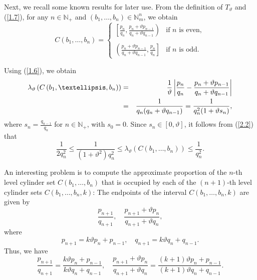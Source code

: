 \documentclass[final,1p,times]{elsarticle}
\numberwithin{equation}{section}
\begin{document}
Next, we recall some known results for later use.  
From the definition of $T_{\vartheta}$ and (\ref{1.7}), for any $n \in \mathbb{N}_+$ and $(b_1, \ldots, b_n) \in \mathbb{N}_m^n$, we obtain  
%
\begin{equation}
C(b_1, \ldots, b_n) = \left\{
\begin{array}{ll}
	\left[ \displaystyle \frac{p_n}{q_n}, \frac{p_n+ \vartheta p_{n-1}}{q_n+ \vartheta q_{n-1}} \right)  & \text{if $n$ is even}, \\
	\\
	\left(\displaystyle \frac{p_n+ \vartheta p_{n-1}}{q_n+ \vartheta q_{n-1}}, \frac{p_n}{q_n} \right] & \text{if $n$ is odd}.
\end{array}
\right. \label{2.1}
\end{equation}
%

Using (\ref{1.6}), we obtain  
%
\begin{eqnarray}
\lambda_{\vartheta}\left(C\left(b_1, \ldots, b_n\right)\right) &=& \frac{1}{\vartheta} \left| \frac{p_n}{q_n} - \frac{p_n+ \vartheta p_{n-1}}{q_n+\vartheta q_{n-1}} \right| \notag \\
&=& \frac{1}{q_n (q_n + \vartheta q_{n-1})} = \frac{1}{q^2_n (1 + \vartheta s_{n})}, \label{2.2}
\end{eqnarray}
%
where $s_n = \frac{q_{n-1}}{q_n}$ for $n \in \mathbb{N}_+$, with $s_0=0$.  
Since $s_n \in [0, \vartheta]$, it follows from (\ref{2.2}) that  
%
\begin{equation}
\frac{1}{2q^2_n} \leq \frac{1}{(1+\vartheta^2) q^2_n} \leq \lambda_{\vartheta}\left(C\left(b_1, \ldots, b_n\right)\right) \leq \frac{1}{q^2_n}. \label{2.3}
\end{equation}
%

An interesting problem is to compute the approximate proportion of the $n$-th level cylinder set $C\left(b_1, \ldots, b_n\right)$ that is occupied by each of the $(n+1)$-th level cylinder sets $C\left(b_1, \ldots, b_n, k\right)$:  
The endpoints of the interval $C\left(b_1, \ldots, b_n, k\right)$ are given by  
\[
\frac{p_{n+1}}{q_{n+1}}, \quad \frac{p_{n+1}+ \vartheta p_n}{q_{n+1}+\vartheta q_n},
\]
where  
\[
p_{n+1} = k \vartheta p_n + p_{n-1}, \quad q_{n+1} = k \vartheta q_n + q_{n-1}.
\]
Thus, we have  
%
\begin{equation*}
\frac{p_{n+1}}{q_{n+1}} = \frac{k \vartheta p_n + p_{n-1}}{k \vartheta q_n + q_{n-1}}, \quad
\frac{p_{n+1}+\vartheta p_n}{q_{n+1}+\vartheta q_n} = \frac{(k+1) \vartheta p_n + p_{n-1}}{(k+1) \vartheta q_n + q_{n-1}}.
\end{equation*}
%
\end{document}
